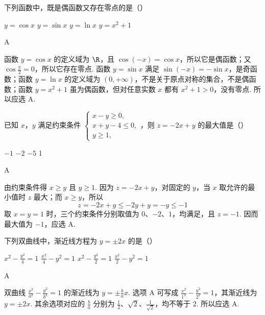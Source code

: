 \begin{problem}
下列函数中，既是偶函数又存在零点的是（\quad）

\choices
    {\(y = \cos x\)}
    {\(y = \sin x\)}
    {\(y = \ln x\)}
    {\(y = x^{2} + 1\)}

\begin{answer}
A
\end{answer}

\begin{solution}
函数 \(y=\cos x\) 的定义域为 \(\R\)，且 \(\cos(-x)=\cos x\)，所以它是偶函数；又 \(\cos\frac{\pi}{2}=0\)，所以它存在零点. 函数 \(y=\sin x\) 满足 \(\sin(-x)=-\sin x\)，是奇函数；函数 \(y=\ln x\) 的定义域为 \((0,+\infty)\)，不是关于原点对称的集合，不是偶函数；函数 \(y=x^2+1\) 虽为偶函数，但对任意实数 \(x\) 都有 \(x^2+1>0\)，没有零点. 所以应选 A.
\end{solution}
\end{problem}

\begin{problem}
已知 \(x\)，\(y\) 满足约束条件 \(\begin{cases}
x - y \geqslant 0,\\
x + y - 4 \leqslant 0,\\
y \geqslant 1,
\end{cases}\)，则 \(z = -2x + y\) 的最大值是（\quad）

\choices
    {\(-1\)}
    {\(-2\)}
    {\(-5\)}
    {1}

\begin{answer}
A
\end{answer}

\begin{solution}
由约束条件得 \(x\geqslant y\) 且 \(y\geqslant1\). 因为 \(z=-2x+y\)，对固定的 \(y\)，当 \(x\) 取允许的最小值时 \(z\) 最大；而 \(x\geqslant y\)，所以
\[
z=-2x+y\leqslant-2y+y=-y\leqslant-1
\]
取 \(x=y=1\) 时，三个约束条件分别取值为 \(0\)、\(-2\)、\(1\)，均满足，且 \(z=-1\). 因而最大值为 \(-1\)，应选 A.
\end{solution}
\end{problem}

\begin{problem}
下列双曲线中，渐近线方程为 \( y = \pm 2x \) 的是（\quad）

\choices
    {\(x^{2} - \frac{y^{2}}{4} = 1\)}
    {\(\frac{x^2}{4} - y^2 = 1\)}
    {\(x^{2} - \frac{y^{2}}{2} = 1\)}
    {\(\frac{x^2}{2} - y^2 = 1\)}

\begin{answer}
A
\end{answer}

\begin{solution}
双曲线 \(\frac{x^2}{a^2}-\frac{y^2}{b^2}=1\) 的渐近线为 \(y=\pm\frac{b}{a}x\). 选项 A 可写成 \(\frac{x^2}{1^2}-\frac{y^2}{2^2}=1\)，其渐近线为 \(y=\pm2x\). 其余选项对应的 \(\frac{b}{a}\) 分别为 \(\frac12\)、\(\sqrt2\)、\(\frac{1}{\sqrt2}\)，均不等于 \(2\). 所以应选 A.
\end{solution}
\end{problem}

